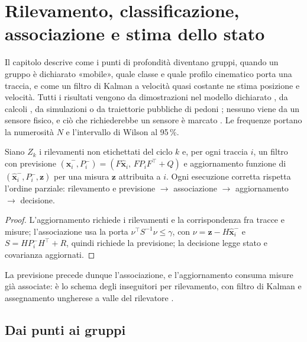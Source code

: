 \section{Rilevamento, classificazione, associazione e stima dello stato}\label{sec:sti}

Il capitolo descrive come i punti di profondità diventano gruppi, quando un gruppo è dichiarato «mobile», quale classe e quale profilo cinematico porta una traccia, e come un filtro di Kalman a velocità quasi costante \cite{kalman1960} ne stima posizione e velocità. Tutti i risultati vengono da dimostrazioni nel modello dichiarato , da calcoli , da simulazioni  o da traiettorie pubbliche di pedoni ; nessuno viene da un sensore fisico, e ciò che richiederebbe un sensore è marcato . Le frequenze portano la numerosità $N$ e l'intervallo di Wilson al 95\,\%.

\begin{proposizione}\label{prop:sti-ordine}
Siano $Z_k$ i rilevamenti non etichettati del ciclo $k$ e, per ogni traccia $i$, un filtro con previsione $(\hat{\mathbf x}_i^-,P_i^-)=(F\hat{\mathbf x}_i,\,FP_iF^{\top}+Q)$ e aggiornamento funzione di $(\hat{\mathbf x}_i^-,P_i^-,\mathbf z)$ per una misura $\mathbf z$ attribuita a $i$. Ogni esecuzione corretta rispetta l'ordine parziale: rilevamento e previsione $\to$ associazione $\to$ aggiornamento $\to$ decisione. 
\end{proposizione}
\begin{proof}
L'aggiornamento richiede i rilevamenti e la corrispondenza fra tracce e misure; l'associazione usa la porta $\nu^{\top}S^{-1}\nu\le\gamma$, con $\nu=\mathbf z-H\hat{\mathbf x}_i^-$ e $S=HP_i^-H^{\top}+R$, quindi richiede la previsione; la decisione legge stato e covarianza aggiornati.
\end{proof}
La previsione precede dunque l'associazione, e l'aggiornamento consuma misure già associate: è lo schema degli inseguitori per rilevamento, con filtro di Kalman e assegnamento ungherese a valle del rilevatore \cite{bewley2016}.


\subsection{Dai punti ai gruppi}\label{sec:sti-gruppi}

